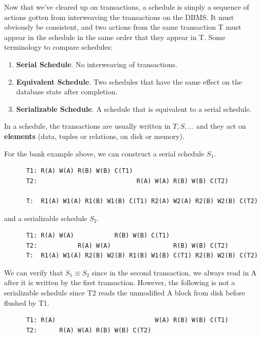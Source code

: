   \begin{definition}[Schedule]
    \label{def:schedule}
    Now that we've cleared up on transactions, a schedule is simply a sequence of actions gotten from interweaving the transactions on the DBMS. It must obviously be consistent, and two actions from the same transaction T must appear in the schedule in the same order that they appear in T. Some terminology to compare schedules: 
    \begin{enumerate}
      \item \textbf{Serial Schedule}. No interweaving of transactions. 
      \item \textbf{Equivalent Schedule}. Two schedules that have the same effect on the database state after completion. 
      \item \textbf{Serializable Schedule}. A schedule that is equivalent to a serial schedule. 
    \end{enumerate}
    In a schedule, the transactions are usually written in $T, S, \ldots$ and they act on \textbf{elements} (data, tuples or relations, on disk or memory). 
  \end{definition}

  \begin{example}
    \label{ex:bank-schedule}
    For the bank example above, we can construct a serial schedule $S_1$. 
    \begin{lstlisting}
      T1: R(A) W(A) R(B) W(B) C(T1)
      T2:                           R(A) W(A) R(B) W(B) C(T2)

      T:  R1(A) W1(A) R1(B) W1(B) C(T1) R2(A) W2(A) R2(B) W2(B) C(T2)
    \end{lstlisting}
    and a serializable schedule $S_2$. 
    \begin{lstlisting}
      T1: R(A) W(A)           R(B) W(B) C(T1) 
      T2:           R(A) W(A)                 R(B) W(B) C(T2)
      T:  R1(A) W1(A) R2(B) W2(B) R1(B) W1(B) C(T1) R2(B) W2(B) C(T2)
    \end{lstlisting}
    We can verify that $S_1 \equiv S_2$ since in the second transaction, we always read in A after it is written by the first transaction. However, the following is not a serializable schedule since T2 reads the unmodified A block from disk before flushed by T1.  
    \begin{lstlisting}
      T1: R(A)                           W(A) R(B) W(B) C(T1)
      T2:      R(A) W(A) R(B) W(B) C(T2)
    \end{lstlisting}
  \end{example} 

